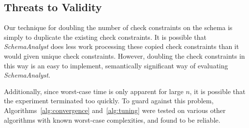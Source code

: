 
\subsection*{Threats to Validity}

Our technique for doubling the number of check constraints on the schema
is simply to duplicate the existing check constraints. It is possible
that \textit{SchemaAnalyst} does less work processing these copied check
constraints than it would given unique check constraints. However,
doubling the check constraints in this way is an easy to implement,
semantically significant way of evaluating \textit{SchemaAnalyst}.

Additionally, since worst-case time is only apparent for large $n$, 
it is possible that the experiment terminated too quickly.  To guard 
against this problem, Algorithms~\ref{alg:convergence} and~\ref{alg:tuning}
were tested on various other algorithms with known worst-case complexities, and 
found to be reliable.
